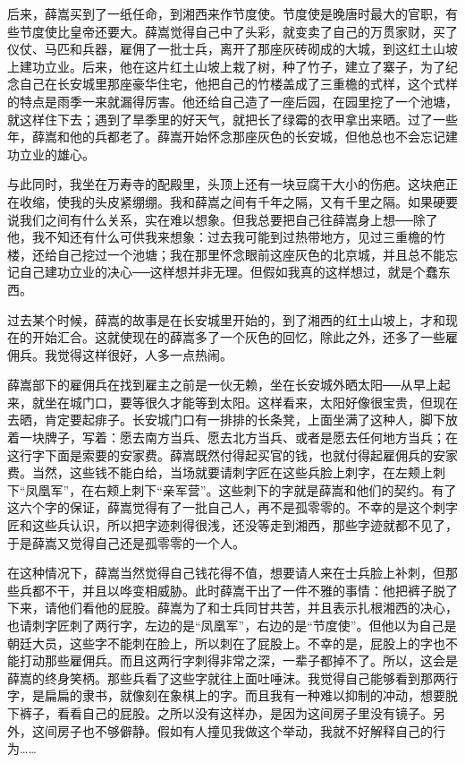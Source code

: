 后来，薛嵩买到了一纸任命，到湘西来作节度使。节度使是晚唐时最大的官职，有些节度使比皇帝还要大。薛嵩觉得自己中了头彩，就变卖了自己的万贯家财，买了仪仗、马匹和兵器，雇佣了一批士兵，离开了那座灰砖砌成的大城，到这红土山坡上建功立业。后来，他在这片红土山坡上栽了树，种了竹子，建立了寨子，为了纪念自己在长安城里那座豪华住宅，他把自己的竹楼盖成了三重檐的式样，这个式样的特点是雨季一来就漏得厉害。他还给自己造了一座后园，在园里挖了一个池塘，就这样住下去；遇到了旱季里的好天气，就把长了绿霉的衣甲拿出来晒。过了一些年，薛嵩和他的兵都老了。薛嵩开始怀念那座灰色的长安城，但他总也不会忘记建功立业的雄心。 

与此同时，我坐在万寿寺的配殿里，头顶上还有一块豆腐干大小的伤疤。这块疤正在收缩，使我的头皮紧绷绷。我和薛嵩之间有千年之隔，又有千里之隔。如果硬要说我们之间有什么关系，实在难以想象。但我总要把自己往薛嵩身上想──除了他，我不知还有什么可供我来想象：过去我可能到过热带地方，见过三重檐的竹楼，还给自己挖过一个池塘；我在那里怀念眼前这座灰色的北京城，并且总不能忘记自己建功立业的决心──这样想并非无理。但假如我真的这样想过，就是个蠢东西。 

过去某个时候，薛嵩的故事是在长安城里开始的，到了湘西的红土山坡上，才和现在的开始汇合。这就使现在的薛嵩多了一个灰色的回忆，除此之外，还多了一些雇佣兵。我觉得这样很好，人多一点热闹。 

薛嵩部下的雇佣兵在找到雇主之前是一伙无赖，坐在长安城外晒太阳──从早上起来，就坐在城门口，要等很久才能等到太阳。这样看来，太阳好像很宝贵，但现在去晒，肯定要起痱子。长安城门口有一排排的长条凳，上面坐满了这种人，脚下放着一块牌子，写着：愿去南方当兵、愿去北方当兵、或者是愿去任何地方当兵；在这行字下面是索要的安家费。薛嵩既然付得起买官的钱，也就付得起雇佣兵的安家费。当然，这些钱不能白给，当场就要请刺字匠在这些兵脸上刺字，在左颊上刺下“凤凰军”，在右颊上刺下“亲军营”。这些刺下的字就是薛嵩和他们的契约。有了这六个字的保证，薛嵩觉得有了一批自己人，再不是孤零零的。不幸的是这个刺字匠和这些兵认识，所以把字迹刺得很浅，还没等走到湘西，那些字迹就都不见了，于是薛嵩又觉得自己还是孤零零的一个人。 

在这种情况下，薛嵩当然觉得自己钱花得不值，想要请人来在士兵脸上补刺，但那些兵都不干，并且以哗变相威胁。此时薛嵩干出了一件不雅的事情：他把裤子脱了下来，请他们看他的屁股。薛嵩为了和士兵同甘共苦，并且表示扎根湘西的决心，也请刺字匠刺了两行字，左边的是“凤凰军”，右边的是“节度使”。但他以为自己是朝廷大员，这些字不能刺在脸上，所以刺在了屁股上。不幸的是，屁股上的字也不能打动那些雇佣兵。而且这两行字刺得非常之深，一辈子都掉不了。所以，这会是薛嵩的终身笑柄。那些兵看了这些字就往上面吐唾沫。我觉得自己能够看到那两行字，是扁扁的隶书，就像刻在象棋上的字。而且我有一种难以抑制的冲动，想要脱下裤子，看看自己的屁股。之所以没有这样办，是因为这间房子里没有镜子。另外，这间房子也不够僻静。假如有人撞见我做这个举动，我就不好解释自己的行为…… 

